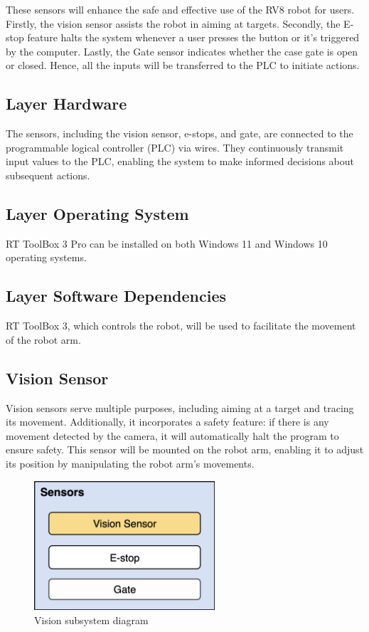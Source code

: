 These sensors will enhance the safe and effective use of the RV8 robot for users. Firstly, the vision sensor assists the robot in aiming at targets. Secondly, the E-stop feature halts the system whenever a user presses the button or it's triggered by the computer. Lastly, the Gate sensor indicates whether the case gate is open or closed. Hence, all the inputs will be transferred to the PLC to initiate actions.


\subsection{Layer Hardware}
The sensors, including the vision sensor, e-stops, and gate, are connected to the programmable logical controller (PLC) via wires. They continuously transmit input values to the PLC, enabling the system to make informed decisions about subsequent actions.

\subsection{Layer Operating System}
RT ToolBox 3 Pro can be installed on both Windows 11 and Windows 10 operating systems.

\subsection{Layer Software Dependencies}
RT ToolBox 3, which controls the robot, will be used to facilitate the movement of the robot arm.

\subsection{Vision Sensor}
Vision sensors serve multiple purposes, including aiming at a target and tracing its movement. Additionally, it incorporates a safety feature: if there is any movement detected by the camera, it will automatically halt the program to ensure safety. This sensor will be mounted on the robot arm, enabling it to adjust its position by manipulating the robot arm's movements.

\begin{figure}[h!]
	\centering
 	\includegraphics[width=0.60\textwidth]{images/vision}
 \caption{Vision subsystem diagram}
\end{figure}

